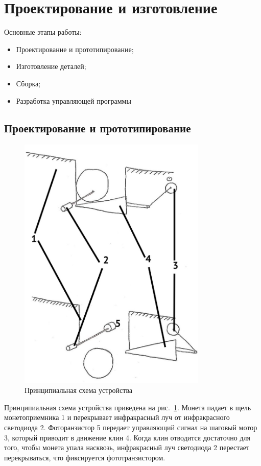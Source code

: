\section {Проектирование и изготовление}

Основные этапы работы:

\begin{itemize}
	\item Проектирование и прототипирование; 
	\item Изготовление деталей;
	\item Сборка;
	\item Разработка управляющей программы
\end{itemize}

\subsection{Проектирование и прототипирование}

\begin{figure}[H]
	\centering
	\includegraphics[width=9cm]{scheme_idea.jpg}
	\caption{Принципиальная схема устройства}
	\label{ris:scheme_idea}
\end{figure}
\par\medskip

Принципиальная схема устройства приведена на рис.~\ref{ris:scheme_idea}. Монета падает в щель монетоприемника 1 и перекрывает инфракрасный луч от инфракрасного светодиода 2. Фоторанзистор 5 передает управляющий сигнал на шаговый мотор 3, который приводит в движение клин 4. Когда клин отводится достаточно для того, чтобы монета упала насквозь, инфракрасный луч светодиода 2 перестает перекрываться, что фиксируется фототранзистором. 
\par\medskip

